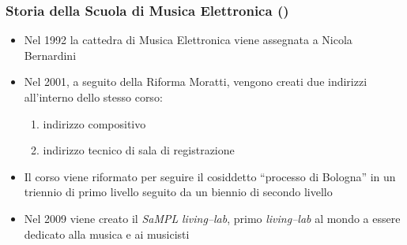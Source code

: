 \begin{frame}
    \frametitle<+->{Storia della Scuola di Musica Elettronica ()}

	\begin{itemize}[<+- | alert@+->]

		\item Nel 1992 la cattedra di Musica Elettronica viene assegnata a Nicola Bernardini

    \item Nel 2001, a seguito della Riforma Moratti, vengono creati due
    indirizzi all'interno dello stesso corso:

      \begin{enumerate}[<+- | alert@+->]

        \item indirizzo compositivo

        \item indirizzo tecnico di sala di registrazione

      \end{enumerate}

    \item Il corso viene riformato per seguire il cosiddetto ``processo di Bologna''
            in un triennio di primo livello seguito da un biennio di secondo
            livello

    \item Nel 2009 viene creato il \emph{SaMPL} \emph{living--lab}, primo
    \emph{living--lab} al mondo a essere dedicato alla musica e ai musicisti

	\end{itemize}

\end{frame}
